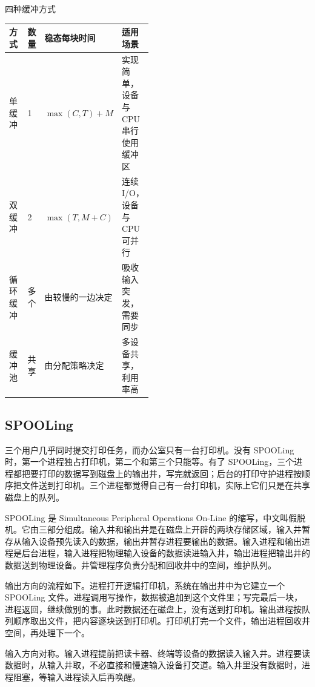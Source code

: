 \begin{tablebox}{四种缓冲方式}
\centering
\small
\begin{tabularx}{\linewidth}{|p{0.14\linewidth}|p{0.09\linewidth}|p{0.24\linewidth}|X|}
\hline
方式 & 数量 & 稳态每块时间 & 适用场景 \\
\hline
单缓冲 & 1 & $\max(C,T)+M$ & 实现简单，设备与 CPU 串行使用缓冲区 \\
双缓冲 & 2 & $\max(T,M+C)$ & 连续 I/O，设备与 CPU 可并行 \\
循环缓冲 & 多个 & 由较慢的一边决定 & 吸收输入突发，需要同步 \\
缓冲池 & 共享 & 由分配策略决定 & 多设备共享，利用率高 \\
\hline
\end{tabularx}
\end{tablebox}

\subsection{SPOOLing}

三个用户几乎同时提交打印任务，而办公室只有一台打印机。没有 SPOOLing 时，第一个进程独占打印机，第二个和第三个只能等。有了 SPOOLing，三个进程都把要打印的数据写到磁盘上的输出井，写完就返回；后台的打印守护进程按顺序把文件送到打印机。三个进程都觉得自己有一台打印机，实际上它们只是在共享磁盘上的队列。

SPOOLing 是 Simultaneous Peripheral Operations On-Line 的缩写，中文叫假脱机。它由三部分组成。输入井和输出井是在磁盘上开辟的两块存储区域，输入井暂存从输入设备预先读入的数据，输出井暂存进程要输出的数据。输入进程和输出进程是后台进程，输入进程把物理输入设备的数据读进输入井，输出进程把输出井的数据送到物理设备。井管理程序负责分配和回收井中的空间，维护队列。

输出方向的流程如下。进程打开逻辑打印机，系统在输出井中为它建立一个 SPOOLing 文件。进程调用写操作，数据被追加到这个文件里；写完最后一块，进程返回，继续做别的事。此时数据还在磁盘上，没有送到打印机。输出进程按队列顺序取出文件，把内容逐块送到打印机。打印机打完一个文件，输出进程回收井空间，再处理下一个。

输入方向对称。输入进程提前把读卡器、终端等设备的数据读入输入井。进程要读数据时，从输入井取，不必直接和慢速输入设备打交道。输入井里没有数据时，进程阻塞，等输入进程读入后再唤醒。

